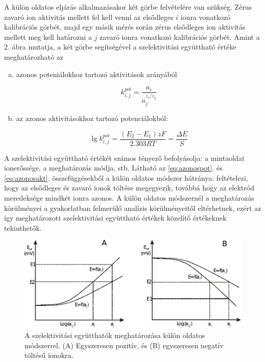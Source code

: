A külön oldatos eljárás alkalmazásakor két görbe felvételére van szükség.
Zérus zavaró ion aktivitás mellett fel kell venni az elsődleges $i$ ionra vonatkozó kalibrációs görbét, majd egy másik mérés során zérus elsődleges ion aktivitás mellett meg kell határozni a $j$ zavaró ionra vonatkozó kalibrációs görbét.
Amint a 2. ábra mutatja, a két görbe segítségével a szelektivitási együttható értéke meghatározható az

\begin{enumerate}[(a)]
\item azonos poteniálokhoz tartozó aktivitások arányából

\begin{equation}
\label{eq:azonospot}
        k_{i,j}^{pot}
        =
        \frac{a_i}{a_j^{z_i/z_j}}
\end{equation}

\item az azonos aktivitásokhoz tartozó potenciálokból:

\begin{equation}
\label{eq:azonosakt}
        \lg k_{i,j}^{pot}
        =
        \frac{(E_2-E_1)zF}{2.303RT}
	=
	\frac{\Delta E}{S}
\end{equation}

\end{enumerate}

A szelektivitási együttható értékét számos tényező befolyásolja: a mintaoldat ionerőssége, a meghatározás módja, stb.
Látható az \ref{eq:azonospot}. és \ref{eq:azonosakt}. összefüggésekből a külön oldatos módszer hátránya: feltételezi, hogy az elsődleges és zavaró ionok töltése megegyezik, továbbá hogy az elektród meredeksége mindkét ionra azonos.
A külön oldatos módszernél a meghatározás körülményei a gyakorlatban felmerülő analízis körülményeitől eltérhetnek, ezért az így meghatározott szelektivitási együttható értékek közelítő értékeknek tekinthetők.

\begin{figure}
\centering
\includegraphics{fig/ion2.eps}
\caption{A szelektivitási együtthatók meghatározása külön oldatos módszerrel. (A) Egyszeresen pozitív, és (B) egyszeresen negatív töltésű ionokra.}
\label{fig:ion2}
\end{figure}

